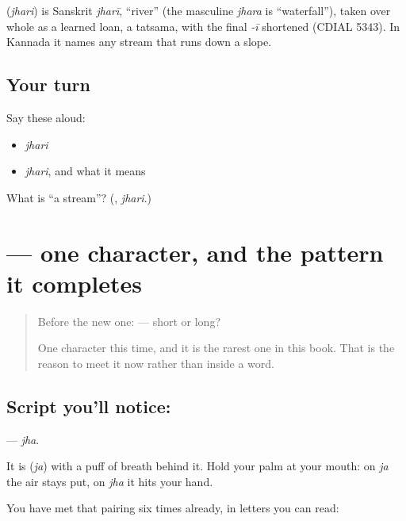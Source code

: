 \begin{cousinweb}
\textbf{} (\emph{jhari}) is Sanskrit \emph{jharī}, \textquotedblleft{}river\textquotedblright{} (the masculine \emph{jhara} is \textquotedblleft{}waterfall\textquotedblright{}), taken over whole as a learned loan, a tatsama, with the final \emph{-ī} shortened (CDIAL 5343). In Kannada it names any stream that runs down a slope.
\end{cousinweb}

\subsection*{Your turn}
Say these aloud:

\begin{itemize}
\raggedright
  \item \emph{jhari}
  \item \emph{jhari}, and what it means
\end{itemize}

\begin{tcolorbox}[breakable,colback=teal!4,colframe=teal!35!black,title={Before you move on}]
What is \textquotedblleft{}a stream\textquotedblright{}? (\textbf{}, \emph{jhari}.)
\end{tcolorbox}
\section[\texorpdfstring{\kn{ಝ} (jha)}{ಝ (jha)}]{ — one character, and the pattern it completes}

\label{lesson:KA-S128-letter-jha}



\begin{quote}
Before the new one:  — short or long?

One character this time, and it is the rarest one in this book. That is the reason to meet it now rather than inside a word.
\end{quote}

\subsection*{Script you'll notice: }
\textbf{} — \emph{jha}.

It is \textbf{} (\emph{ja}) with a puff of breath behind it. Hold your palm at your mouth: on \emph{ja} the air stays put, on \emph{jha} it hits your hand.

You have met that pairing six times already, in letters you can read:

